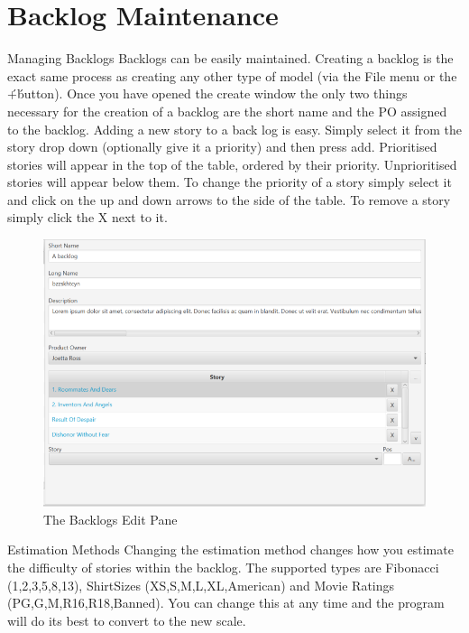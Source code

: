 \section{Backlog Maintenance}

Managing Backlogs
\newline\newline
Backlogs can be easily maintained. Creating a backlog is the exact same process as creating any other type of model (via the File menu or the \'+\' button). Once you have opened the create window the only two things necessary for the creation of a backlog are the short name and the PO assigned to the backlog.
\newline
Adding a new story to a back log is easy. Simply select it from the story drop down (optionally give it a priority) and then press add. Prioritised stories will appear in the top of the table, ordered by their priority. Unprioritised stories will appear below them. To change the priority of a story simply select it and click on the up and down arrows to the side of the table. To remove a story simply click the X next to it.

\begin{figure}[H]
\centering
\includegraphics[width=\textwidth]{images/screenshots/backlogs.PNG}
\caption{The Backlogs Edit Pane}
\label{fig:new_project}
\end{figure}

\newline
Estimation Methods
\newline
Changing the estimation method changes how you estimate the difficulty of stories within the backlog. The supported types are Fibonacci (1,2,3,5,8,13), ShirtSizes (XS,S,M,L,XL,American) and Movie Ratings (PG,G,M,R16,R18,Banned). You can change this at any time and the program will do its best to convert to the new scale.

